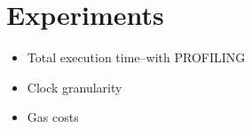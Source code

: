\section{Experiments}

\begin{itemize}
\item Total execution time--with PROFILING
\item Clock granularity
\item Gas costs
\end{itemize}

